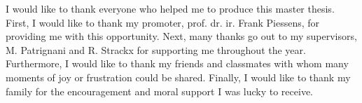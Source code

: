 \documentclass[10pt,a4paper,master=cws, masteroption=ai,english,inputenc=utf8]{kulemt}
\begin{document}
\newcommand{\MiniML}{\mbox{MiniML}} %
\newcommand{\cmath}[1]{\ensuremath{\mathit{#1}}} %
\newcommand{\lsttext}[1]{\lstinline[mathescape]!#1!} %
\newcommand{\longspace}{\;\;\;\;\;\;}
\newcommand{\inlinecode}{\lsttext}
\newcommand{\expl}[1]{{\text{\footnotesize#1}}}
\newcommand{\LLVMIR}{\mbox{LLVM IR}}
\newcommand{\compiled}[1]{#1^{\downarrow}}
\newcommand{\ova}{\overline{\alpha}}
\newcommand{\gray}{\cellcolor{lightgray}}
\newcommand{\earlier}[2]{{\protect\myref{#1}{#2}} on {\protect\mypageref{#2}}}
\newcommand{\intertextt}[1]{
& & \\
\multicolumn{3}{@{}p{\textwidth}@{}}{\indent#1}\\
& & \\
}
\newcommand{\annot}[1]{[#1]}
\newcommand{\nl}{\\ & &}
\newcommand{\makes}{& \ensuremath{\rightarrow} &}
\newcommand{\compile}[1]{[[#1]]}
\newcommand{\mypageref}[1]{Page~\pageref{#1}}

\newcommand{\surroundrule}[2][0.3em]{
\leavevmode\raisedrule[#1]{1pt}#2\raisedrule[#1]{1pt}}
\newenvironment{attack}[1]{\par\par\noindent\hspace{-1ex}\surroundrule{#1}\vspace{-0.5em}\par\par}{~\vspace{0.5em}\par\par\noindent\leavevmode\raisedrule[1em]{1pt}\\}



\begin{preface}
I would like to thank everyone who helped me to produce this master thesis.
First, I would like to thank my promoter,
prof. dr. ir. Frank Piessens, for providing me with this opportunity.
Next, many thanks go out to my supervisors, M. Patrignani and R. Strackx for supporting me throughout the year.
Furthermore, I would like to thank my friends and classmates with whom many moments of joy or frustration could be shared.
Finally, I would like to thank my family for the encouragement and moral support I was lucky to receive.
\end{preface}
\end{document}
